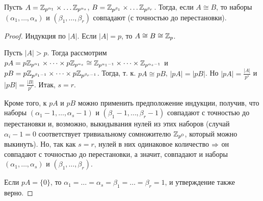 \documentclass[main]{subfiles}
\begin{document}
\begin{proposition}
  Пусть \( A = \mathbb{Z}_{p^{\alpha_1}} \times
  \dots \mathbb{Z}_{p^{\alpha_s}} \),
  \( B = \mathbb{Z}_{p^{\beta_1}} \times
  \dots \mathbb{Z}_{p^{\beta_r}} \).
  Тогда, если \( A \cong B \), то
  наборы \( (\alpha_1, \dots, \alpha_s) \) и
  \( (\beta_1, \dots, \beta_r) \) совпадают
  (с точностью до перестановки).
\end{proposition}
\begin{proof}
  Индукция по \( |A| \). Если \( |A| = p \),
  то \( A \cong B \cong \mathbb{Z}_p \).

  Пусть \( |A| > p \). Тогда рассмотрим
  \( pA = p\mathbb{Z}_{p^{\alpha_1}} \times \dots \times
  p \mathbb{Z}_{p^{\alpha_s}}
  \cong \mathbb{Z}_{p^{\alpha_1 - 1}}  \times \dots
  \times \mathbb{Z}_{p^{\alpha_s - 1}} \) и
  \( pB = p \mathbb{Z}_{p^{\beta_1 - 1}} \times \dots \times
  p \mathbb{Z}_{p^{\beta_r - 1}} \).
  Тогда, т. к. \( pA \cong pB \),
  \( |pA| = |pB| \). Но \(|pA| = \frac{|A|}{p^s} \)
  и \( |pB| = \frac{|B|}{p^r} \). Итак,
  \( s = r \).

  Кроме того, к \( pA \) и \( pB \) можно применить предположение
  индукции, получив, что наборы
  \( (\alpha_1 - 1, \dots, \alpha_s - 1) \) и
  \( (\beta_1 - 1, \dots, \beta_r - 1) \) совпадают
  с точностью до перестановки и, возможно, выкидывания
  нулей из этих наборов (случай \( \alpha_i - 1 = 0 \)
  соответствует тривиальному сомножителю \( \mathbb{Z}_{p^0} \),
  который можно выкинуть).
  Но, так как \( s = r \), нулей в них одинаковое количество
  \( \Rightarrow \) он совпадают с точностью до перестановки,
  а значит, совпадают и наборы
  \( (\alpha_1, \dots, \alpha_s) \) и
  \( (\beta_1, \dots, \beta_r) \).

  Если \( pA = \{ 0 \} \), то \( \alpha_1 = \dots = \alpha_s = 
  \beta_1 = \dots = \beta_r = 1 \), и утверждение
  также верно.
\end{proof}
\end{document}

